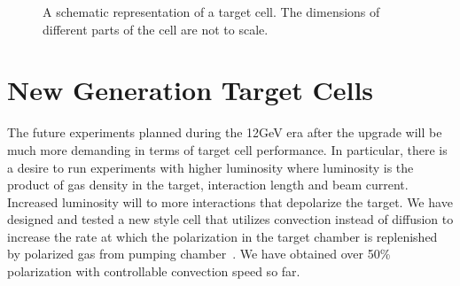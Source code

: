 \begin{figure}[H]
	\centering
	\caption{{ A schematic representation of a target cell. The dimensions of different parts of the cell are not to scale.}}
	\label{TargetCell}
\end{figure}

\section{New Generation Target Cells}

The future experiments planned during the 12GeV era after the upgrade will be much more demanding in terms of target cell performance. In particular, there is a desire to run experiments with higher luminosity where luminosity is the product of gas density in the target, interaction length and beam current. Increased luminosity will to more interactions that depolarize the target. We have designed and tested a new style cell that utilizes convection instead of diffusion to increase the rate at which the polarization in the target chamber is replenished by polarized gas from pumping chamber~\cite{PhysRevC.84.065201}. We have obtained over 50\% polarization with controllable convection speed so far.

